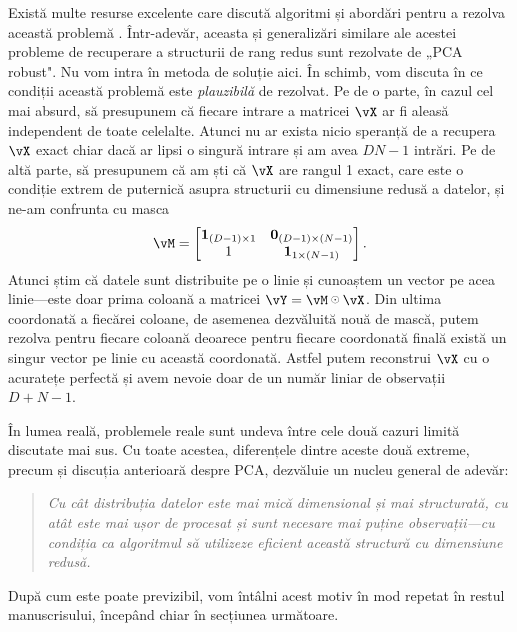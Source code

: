 \documentclass[../../book-main_ro.tex]{subfiles}
\begin{document}
Există multe resurse excelente care discută algoritmi și abordări pentru a rezolva această problemă \cite{Wright-Ma-2022}. Într-adevăr, aceasta și generalizări similare ale acestei probleme de recuperare a structurii de rang redus sunt rezolvate de „PCA robust". Nu vom intra în metoda de soluție aici. În schimb, vom discuta în ce condiții această problemă este \textit{plauzibilă} de rezolvat. Pe de o parte, în cazul cel mai absurd, să presupunem că fiecare intrare a matricei \(\vX\) ar fi aleasă independent de toate celelalte. Atunci nu ar exista nicio speranță de a recupera \(\vX\) exact chiar dacă ar lipsi o singură intrare și am avea \(DN - 1\) intrări. Pe de altă parte, să presupunem că am ști că \(\vX\) are rangul 1 exact, care este o condiție extrem de puternică asupra structurii cu dimensiune redusă a datelor, și ne-am confrunta cu masca
\begin{equation}
    \vM = \mat{\vone_{(D - 1) \times 1} & \vzero_{(D - 1) \times (N - 1)} \\ 1 & \vone_{1 \times (N - 1)} }.
\end{equation}
Atunci știm că datele sunt distribuite pe o linie și cunoaștem un vector pe
acea linie---este doar prima coloană a matricei \(\vY = \vM \hada \vX\). Din ultima coordonată a fiecărei coloane, de asemenea dezvăluită nouă de mască, putem rezolva pentru fiecare coloană deoarece pentru fiecare coordonată finală există un singur vector pe linie cu această coordonată. Astfel putem reconstrui \(\vX\) cu o acuratețe perfectă și avem nevoie doar de un număr liniar de observații \(D + N - 1\).

În lumea reală, problemele reale sunt undeva între cele două cazuri limită discutate mai sus. Cu toate acestea, diferențele dintre aceste două extreme, precum și discuția anterioară despre PCA, dezvăluie un nucleu general de adevăr:
\begin{quote}
    \centering
    \textit{Cu cât distribuția datelor este mai mică dimensional și mai structurată, cu atât este mai ușor de procesat și sunt necesare mai puține observații---cu condiția ca algoritmul să utilizeze eficient această structură cu dimensiune redusă.}
\end{quote}
După cum este poate previzibil, vom întâlni acest motiv în mod repetat în restul manuscrisului, începând chiar în secțiunea următoare.
\end{document}

